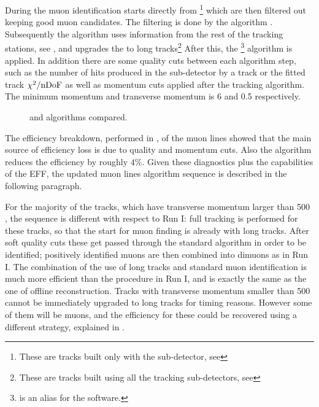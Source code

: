 During \runone the muon identification starts directly from \veloTracks\footnote{These are tracks built only with the \velo sub-detector, see }
which are then filtered out keeping good muon candidates. The filtering is done by the \mvm algorithm \cite{LHCb-PUB-2011-017}.
Subsequently the \FwD algorithm uses information from the rest of the tracking stations, see , and
upgrades the \veloTracks to long tracks\footnote{These are tracks built using all the tracking sub-detectors, see }
After this, the \isMuon\footnote{\isMuon is an alias for the \muonID software.} algorithm is applied.
In addition there are some quality cuts between each algorithm step, such as the number of hits produced in the
\velo sub-detector by a track or the fitted track $\chi^2/{\rm nDoF}$ as well as momentum cuts applied after the \FwD
tracking algorithm. The minimum momentum and transverse momentum is 6 \gevc and 0.5 \gevc respectively.

\begin{figure}[t]
  \centering
  \scalebox{1}{}
  \scalebox{1}{}
 \caption{ \runone and \runtwo \hltone algorithms compared. }
  \label{hlt1_algo_seq}
\end{figure}

The efficiency breakdown, performed in \cite{kevinThesis}, of the \runone \hltone muon lines showed that the
main source of efficiency loss is due to quality and momentum cuts. Also the \mvm algorithm reduces the
efficiency by roughly $4\%$. Given these diagnostics plus the \runtwo capabilities of the EFF, the updated
\hltone muon lines algorithm sequence is described in the following paragraph.

For the majority of the tracks, which have transverse momentum larger than 500 \mevc, the sequence is different with respect to
Run I: full tracking is performed for these tracks, so that the start for muon finding is already with long tracks.
After soft quality cuts these get passed through the standard \isMuon algorithm in order to be identified;
positively identified muons are then combined into dimuons as in Run I.
The combination of the use of long tracks and standard muon identification is much more efficient than the
procedure in Run I, and is exactly the same as the one of offline reconstruction.
Tracks with transverse momentum smaller than 500 \mevc cannot be immediately upgraded to long tracks for timing reasons.
However some of them will be muons, and the efficiency for these could be recovered using a different strategy,
explained in .
